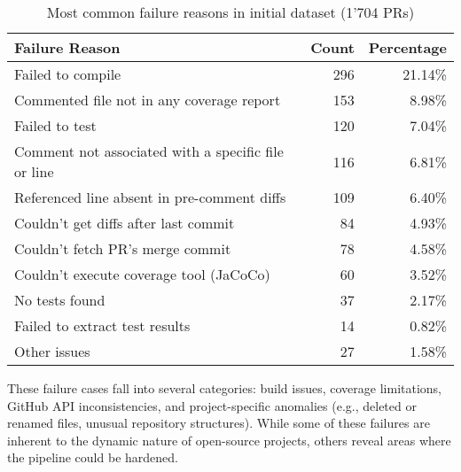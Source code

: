 \begin{table}[ht]
	\centering
	\begin{tabular}{lrr}
		\toprule
		\textbf{Failure Reason}                             & \textbf{Count} & \textbf{Percentage} \\
		\midrule
		Failed to compile                                   & 296            & 21.14\%             \\
		Commented file not in any coverage report           & 153            & 8.98\%              \\
		Failed to test                                      & 120            & 7.04\%              \\
		Comment not associated with a specific file or line & 116            & 6.81\%              \\
		Referenced line absent in pre-comment diffs         & 109            & 6.40\%              \\
		Couldn't get diffs after last commit                & 84             & 4.93\%              \\
		Couldn't fetch PR's merge commit\footnotemark       & 78             & 4.58\%              \\
		Couldn't execute coverage tool (JaCoCo)             & 60             & 3.52\%              \\
		No tests found                                      & 37             & 2.17\%              \\
		Failed to extract test results                      & 14             & 0.82\%              \\
		Other issues                                        & 27             & 1.58\%              \\
		\bottomrule
	\end{tabular}
	\caption{Most common failure reasons in initial dataset (1'704 PRs)}
	\label{tab:failure-distribution}
\end{table}


These failure cases fall into several categories: build issues, coverage limitations, GitHub API
inconsistencies, and project-specific anomalies (e.g., deleted or renamed files, unusual repository
structures). While some of these failures are inherent to the dynamic nature of open-source
projects, others reveal areas where the pipeline could be hardened.

